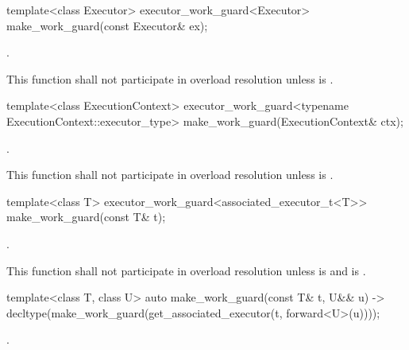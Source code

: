 %
\begin{itemdecl}
template<class Executor>
  executor_work_guard<Executor>
    make_work_guard(const Executor& ex);
\end{itemdecl}

\begin{itemdescr}
\pnum
\returns {}.

\pnum
\remarks This function shall not participate in overload resolution unless
 is .
\end{itemdescr}

%
\begin{itemdecl}
template<class ExecutionContext>
  executor_work_guard<typename ExecutionContext::executor_type>
    make_work_guard(ExecutionContext& ctx);
\end{itemdecl}

\begin{itemdescr}
\pnum
\returns {}.

\pnum
\remarks This function shall not participate in overload resolution
unless  is .
\end{itemdescr}

%
\begin{itemdecl}
template<class T>
  executor_work_guard<associated_executor_t<T>>
    make_work_guard(const T& t);
\end{itemdecl}

\begin{itemdescr}
\pnum
\returns {}.

\pnum
\remarks This function shall not participate in overload resolution unless
 is 
and  is .
\end{itemdescr}

%
\begin{itemdecl}
template<class T, class U>
  auto make_work_guard(const T& t, U&& u)
    -> decltype(make_work_guard(get_associated_executor(t, forward<U>(u))));
\end{itemdecl}

\begin{itemdescr}
\pnum
\returns {}.
\end{itemdescr}



